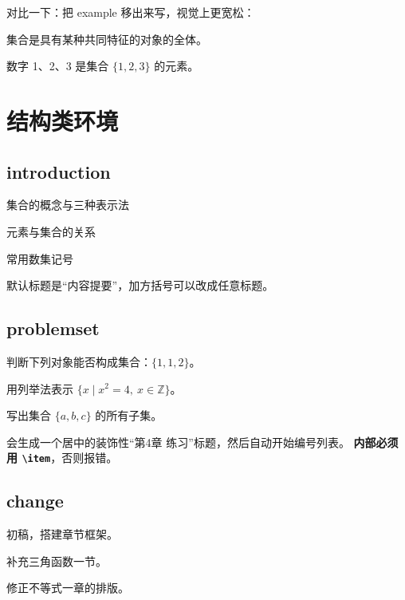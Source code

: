 \documentclass[lang=cn,newtx,10pt,scheme=chinese,nofont]{elegantbook}
\begin{document}
对比一下：把 example 移出来写，视觉上更宽松：

\begin{definition}[集合（另一种写法）]
集合是具有某种共同特征的对象的全体。
\end{definition}

\begin{example}
数字 1、2、3 是集合 $\{1,2,3\}$ 的元素。
\end{example}


\chapter{结构类环境}

\section{introduction}

\begin{introduction}[本节要点]
    \item 集合的概念与三种表示法
    \item 元素与集合的关系
    \item 常用数集记号
\end{introduction}

默认标题是“内容提要”，加方括号可以改成任意标题。

\section{problemset}

\begin{problemset}
    \item 判断下列对象能否构成集合：$\{1, 1, 2\}$。
    \item 用列举法表示 $\{x \mid x^2=4,\ x \in \mathbb{Z}\}$。
    \item 写出集合 $\{a,b,c\}$ 的所有子集。
\end{problemset}

会生成一个居中的装饰性“第4章 练习”标题，然后自动开始编号列表。
\textbf{内部必须用 \texttt{\textbackslash item}}，否则报错。

\section{change}

\begin{change}
    \item 初稿，搭建章节框架。
    \item 补充三角函数一节。
    \item 修正不等式一章的排版。
\end{change}
\end{document}
